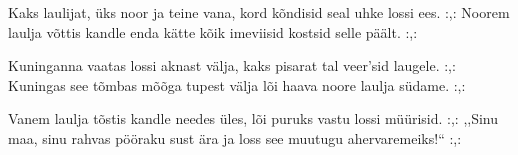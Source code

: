 Kaks laulijat, \"uks noor ja teine vana,
kord k\~ondisid seal uhke lossi ees.
:,: Noorem laulja v\~ottis kandle enda k\"atte
k\~oik imeviisid kostsid selle p\"a\"alt. :,:

Kuninganna vaatas lossi aknast v\"alja,
kaks pisarat tal veer'sid laugele.
:,: Kuningas see t\~ombas m\~o\~oga tupest v\"alja
l\~oi haava noore laulja s\"udame. :,:

Vanem laulja t\~ostis kandle needes \"ules,
l\~oi puruks vastu lossi m\"u\"urisid.
:,: ,,Sinu maa, sinu rahvas p\"o\"oraku sust \"ara
ja loss see muutugu ahervaremeiks!{``} :,: